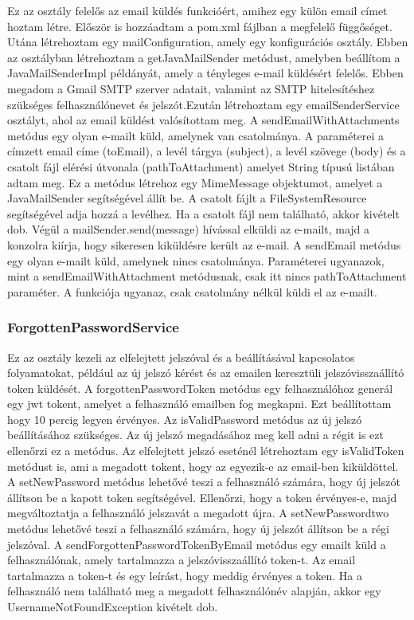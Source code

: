 Ez az osztály felelős az email küldés funkcióért, amihez egy külön email címet hoztam létre. Először is hozzáadtam a pom.xml fájlban a megfelelő függőséget. Utána létrehoztam egy mailConfiguration, amely egy konfigurációs osztály. Ebben az osztályban létrehoztam a getJavaMailSender metódust, amelyben beállítom a JavaMailSenderImpl példányát, amely a tényleges e-mail küldésért felelős. Ebben megadom a Gmail SMTP szerver adatait, valamint az SMTP hitelesítéshez szükséges felhasználónevet és jelszót.Ezután létrehoztam egy emailSenderService osztályt, ahol az email küldést valósítottam meg. A sendEmailWithAttachments metódus egy olyan e-mailt küld, amelynek van csatolmánya. A paraméterei a címzett email címe (toEmail), a levél tárgya (subject), a levél szövege (body) és a csatolt fájl elérési útvonala (pathToAttachment) amelyet String típusú listában adtam meg. Ez a metódus létrehoz egy MimeMessage objektumot, amelyet a JavaMailSender segítségével állít be. A csatolt fájlt a FileSystemResource segítségével adja hozzá a levélhez. Ha a csatolt fájl nem található, akkor kivételt dob. Végül a mailSender.send(message) hívással elküldi az e-mailt, majd a konzolra kiírja, hogy sikeresen kiküldésre került az e-mail. A sendEmail metódus egy olyan e-mailt küld, amelynek nincs csatolmánya. Paraméterei ugyanazok, mint a sendEmailWithAttachment metódusnak, csak itt nincs pathToAttachment paraméter. A funkciója ugyanaz, csak csatolmány nélkül küldi el az e-mailt.

\subsubsection{ForgottenPasswordService}

Ez az osztály kezeli az elfelejtett jelszóval és a beállításával kapcsolatos folyamatokat, például az új jelszó kérést és az emailen keresztüli jelszóvisszaállító token küldését. A forgottenPasswordToken metódus egy felhasználóhoz generál egy jwt tokent, amelyet a felhasználó emailben fog megkapni. Ezt beállítottam hogy 10 percig legyen érvényes. Az isValidPassword metódus az új jelszó beállításához szükséges. Az új jelszó megadásához meg kell adni a régit is ezt ellenőrzi ez a metódus. Az elfelejtett jelszó eseténél létrehoztam egy isValidToken metódust is, ami a megadott tokent, hogy az egyezik-e az email-ben kiküldöttel. A setNewPassword metódus lehetővé teszi a felhasználó számára, hogy új jelszót állítson be a kapott token segítségével. Ellenőrzi, hogy a token érvényes-e, majd megváltoztatja a felhasználó jelszavát a megadott újra. A setNewPasswordtwo metódus lehetővé teszi a felhasználó számára, hogy új jelszót állítson be a régi jelszóval. A sendForgottenPasswordTokenByEmail metódus egy emailt küld a felhasználónak, amely tartalmazza a jelszóvisszaállító token-t. Az email tartalmazza a token-t és egy leírást, hogy meddig érvényes a token. Ha a felhasználó nem található meg a megadott felhasználónév alapján, akkor egy UsernameNotFoundException kivételt dob.

